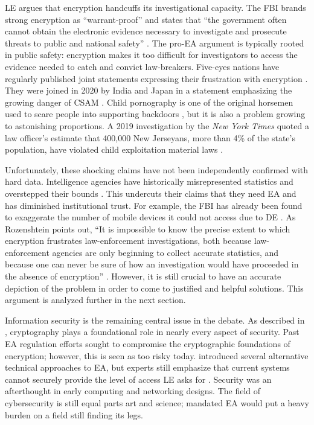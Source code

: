 \Acl{LE} argues that encryption handcuffs its investigational capacity. The \ac{FBI} brands strong encryption as
``warrant-proof'' and states that ``the government often cannot obtain the electronic evidence necessary to investigate
and prosecute threats to public and national safety'' \cite{fbi_2020}. The pro-\ac{EA} argument is typically rooted in
public safety: encryption makes it too difficult for investigators to access the evidence needed to catch and convict
law-breakers. Five-eyes nations have regularly published joint statements expressing their frustration with encryption
\cite{ministerial_2018} \cite{goodale_2017}. They were joined in 2020 by India and Japan in a statement emphasizing the
growing danger of \ac{CSAM} \cite{intl_2020}. Child pornography is one of the original \ac{horsemen} used to scare
people into supporting backdoors \cite{schneier_scaring_2019}, but it is also a problem growing to astonishing
proportions. A 2019 investigation by the \textit{New York Times} quoted a law officer's estimate that 400,000 New
Jerseyans, more than 4\% of the state's population, have violated child exploitation material laws
\cite{keller_internet_2019}.

Unfortunately, these shocking claims have not been independently confirmed with hard data. Intelligence agencies have
historically misrepresented statistics and overstepped their bounds \cite{johnson_congressional_2004}
\cite{shamsi_2011}. This undercuts their claims that they need \ac{EA} and has diminished institutional trust. For
example, the \ac{FBI} has already been found to exaggerate the number of mobile devices it could not access due to
\acl{DE} \cite{devlin_2018}. As Rozenshtein points out, ``It is impossible to know the precise extent to which
encryption frustrates law-enforcement investigations, both because law-enforcement agencies are only beginning to
collect accurate statistics, and because one can never be sure of how an investigation would have proceeded in the
absence of encryption'' \cite{rozenshtein_wicked_2018}. However, it is still crucial to have an accurate depiction of
the problem in order to come to justified and helpful solutions. This argument is analyzed further in the next section.

Information security is the remaining central issue in the debate. As described in ,
\ac{cryptography} plays a foundational role in nearly every aspect of security. Past \ac{EA} regulation efforts sought
to compromise the cryptographic foundations of encryption; however, this is seen as too risky today.
 introduced several alternative technical approaches to \ac{EA}, but experts still emphasize
that current systems cannot securely provide the level of access \acl{LE} asks for \cite{abelson_2015}
\cite{abelson_risks_1997}. Security was an afterthought in early computing and networking designs. The field of
cybersecurity is still equal parts art and science; mandated \ac{EA} would put a heavy burden on a field still finding
its legs.

